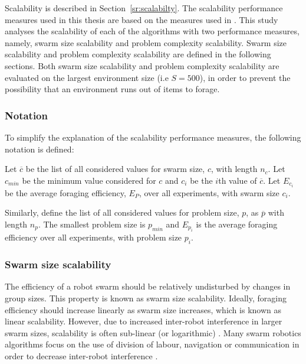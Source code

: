 Scalability is described in Section~\ref{sr:scalabilty}. The scalability performance measures used in this thesis are based on the measures used in \cite{hecker2015beyond}. This study analyses the scalability of each of the algorithms with two performance measures, namely, swarm size scalability and problem complexity scalability. Swarm size scalability and problem complexity scalability are defined in the following sections. Both swarm size scalability and problem complexity scalability are evaluated on the largest environment size (i.e $S=500$), in order to prevent the possibility that an environment runs out of items to forage.

\subsubsection{Notation}

To simplify the explanation of the scalability performance measures, the following notation is defined:

Let $\overline{c}$ be the list of all considered values for swarm size, $c$, with length $n_c$. Let $c_{min}$ be the minimum value considered for $c$ and $c_i$ be the $i$th value of $\overline{c}$. Let $E_{c_i}$ be the average foraging efficiency, $E_P$, over all experiments, with swarm size $c_i$.

Similarly, define the list of all considered values for problem size, $p$, as $\overline{p}$ with length $n_p$. The smallest problem size is $p_{min}$ and $E_{p_i}$ is the average foraging efficiency over all experiments, with problem size $p_i$.


\subsubsection{Swarm size scalability}
\label{swarmsizescalability}

The efficiency of a robot swarm should be relatively undisturbed by changes in group sizes. This property is known as swarm size scalability. Ideally, foraging efficiency should increase linearly as swarm size increases, which is known as linear scalability. However, due to increased inter-robot interference in larger swarm sizes, scalability is often sub-linear (or logarithmic) \cite{lerman2002mathematical}. Many swarm robotics algorithms focus on the use of division of labour, navigation or communication in order to decrease inter-robot interference \cite{lerman2002mathematical, schneider1998territorial}.

